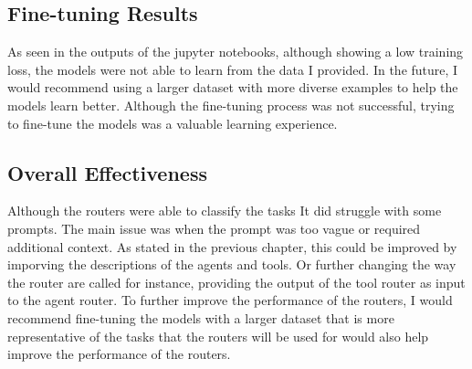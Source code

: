 \subsection{Fine-tuning Results}
\label{sec:results-fine-tuning-results}


As seen in the outputs of the jupyter notebooks, although showing a low training loss, the models were not able to learn from the data I provided. In the future, I would recommend using a larger dataset with more diverse examples to help the models learn better. Although the fine-tuning process was not successful, trying to fine-tune the models was a valuable learning experience.


\subsection{Overall Effectiveness}
\label{sec:results-effectiveness}

Although the routers were able to classify the tasks It did struggle with some prompts. The main issue was when the prompt was too vague or required additional context. As stated in the previous chapter, this could be improved by imporving the descriptions of the agents and tools. Or further changing the way the router are called for instance, providing the output of the tool router as input to the agent router. To further improve the performance of the routers, I would recommend fine-tuning the models with a larger dataset that is more representative of the tasks that the routers will be used for would also help improve the performance of the routers.



